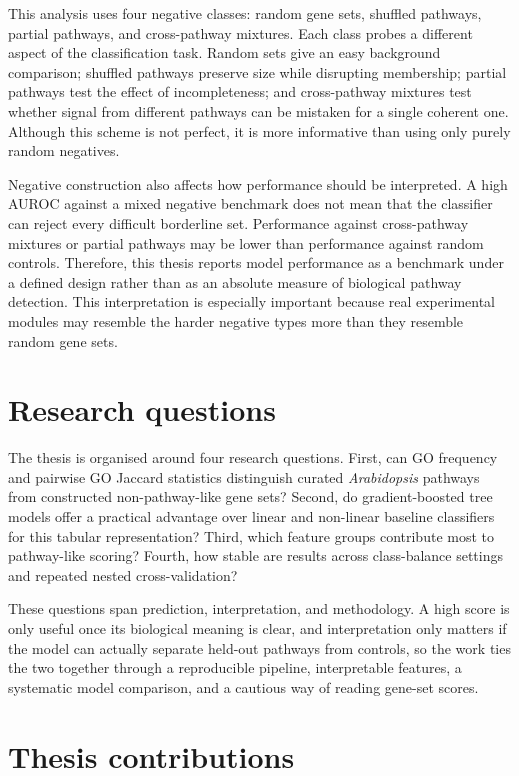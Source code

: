 \documentclass[12pt,letterpaper,oneside,openany]{book}
\begin{document}
This analysis uses four negative classes: random gene sets, shuffled pathways, partial pathways, and cross-pathway mixtures. Each class probes a different aspect of the classification task. Random sets give an easy background comparison; shuffled pathways preserve size while disrupting membership; partial pathways test the effect of incompleteness; and cross-pathway mixtures test whether signal from different pathways can be mistaken for a single coherent one. Although this scheme is not perfect, it is more informative than using only purely random negatives.

Negative construction also affects how performance should be interpreted. A high AUROC against a mixed negative benchmark does not mean that the classifier can reject every difficult borderline set. Performance against cross-pathway mixtures or partial pathways may be lower than performance against random controls. Therefore, this thesis reports model performance as a benchmark under a defined design rather than as an absolute measure of biological pathway detection. This interpretation is especially important because real experimental modules may resemble the harder negative types more than they resemble random gene sets.

\section{Research questions}
\label{sec:bg_research_questions}

The thesis is organised around four research questions. First, can GO frequency and pairwise GO Jaccard statistics distinguish curated \textit{Arabidopsis} pathways from constructed non-pathway-like gene sets? Second, do gradient-boosted tree models offer a practical advantage over linear and non-linear baseline classifiers for this tabular representation? Third, which feature groups contribute most to pathway-like scoring? Fourth, how stable are results across class-balance settings and repeated nested cross-validation?

These questions span prediction, interpretation, and methodology. A high score is only useful once its biological meaning is clear, and interpretation only matters if the model can actually separate held-out pathways from controls, so the work ties the two together through a reproducible pipeline, interpretable features, a systematic model comparison, and a cautious way of reading gene-set scores.

\section{Thesis contributions}
\label{sec:bg_contributions}
\end{document}

